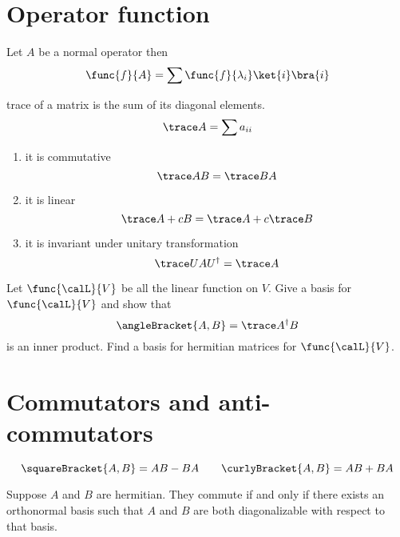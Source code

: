 \section{Operator function}
Let \(A\) be a normal operator then 
\begin{equation*}
    \func{f}{A} = \sum \func{f}{\lambda_i} \ket{i}\bra{i}
\end{equation*}

trace of a matrix is the sum of its diagonal elements. 
\begin{equation*}
    \trace A = \sum a_{ii}
\end{equation*}
\begin{proposition}
    \begin{enumerate}
        \item it is commutative 
        \begin{equation*}
            \trace AB =  \trace BA
        \end{equation*}
        \item it is linear 
        \begin{equation*}
            \trace A + cB = \trace A + c \trace B
        \end{equation*}
        \item it is invariant under unitary transformation
        \begin{equation*}
            \trace U A U^{\dagger} = \trace A
        \end{equation*}
    \end{enumerate}
\end{proposition}

\begin{proposition}
    Let \(\func{\calL}{V}\) be all the linear function on \(V\). Give a basis for \(\func{\calL}{V}\) and show that 
    \begin{equation*}
        \angleBracket{A,B} = \trace A^{\dagger}B
    \end{equation*}
    is an inner product. Find a basis for hermitian matrices for \(\func{\calL}{V}\).
\end{proposition}

\section{Commutators and anti-commutators}
\begin{equation*}
    \squareBracket{A,B} = AB - BA  \qquad \curlyBracket{A,B} = AB + BA
\end{equation*}
\begin{theorem} Suppose \(A\) and \(B\) are hermitian. They commute if and only if there exists an orthonormal basis such that \(A\) and \(B\) are both diagonalizable with respect to that basis.
\end{theorem}

